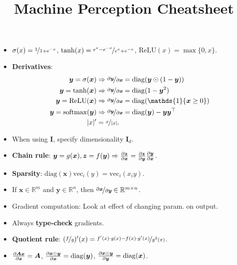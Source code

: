 \documentclass{article}
\title{Machine Perception Cheatsheet}
\newcommand{\R}{\mathbb{R}}
\renewcommand{\vec}[1]{\bm{#1}}
\newcommand{\mat}[1]{\bm{#1}}
\begin{document}
\setlength{\columnsep}{0.15cm}

\begin{multicols*}{2}

    \begin{itemize}
        \item $\sigma(x) = \nicefrac{1}{1 + e^{-x}}$, $\tanh(x) = \nicefrac{e^x - e^{-x}}{e^x + e^{-x}}$, $\mathrm{ReLU}(x) = \max\{ 0,x \}$.
        \item \textbf{Derivatives}:
              \begin{align*}
                  \vec{y} = \sigma(\vec{x})           & \Rightarrow \nicefrac{\partial \vec{y}}{\partial \vec{x}} = \mathrm{diag}(\vec{y} \odot (1 - \vec{y}))    \\
                  \vec{y} = \tanh(\vec{x})            & \Rightarrow \nicefrac{\partial \vec{y}}{\partial \vec{x}} = \mathrm{diag}(1 - \vec{y}^2)                  \\
                  \vec{y} = \mathrm{ReLU}(\vec{x})    & \Rightarrow \nicefrac{\partial \vec{y}}{\partial \vec{x}} = \mathrm{diag}(\mathds{1}\{ \vec{x} \geq 0 \}) \\
                  \vec{y} = \mathrm{softmax}(\vec{y}) & \Rightarrow \nicefrac{\partial \vec{y}}{\partial \vec{x}} = \mathrm{diag}(\vec{y}) - \vec{y} \vec{y}^\top \\
                  |x|'                                & = \nicefrac{x}{|x|}.
              \end{align*}
        \item When using $\mat{I}$, specify dimensionality $\mat{I}_d$.
        \item \textbf{Chain rule}: $\vec{y} = g(\vec{x}), \vec{z} = f(\vec{y}) \Rightarrow \pdv{\vec{z}}{\vec{x}} = \pdv{\vec{z}}{\vec{y}} \pdv{\vec{y}}{\vec{x}}$.
        \item \textbf{Sparsity}: $\mathrm{diag}(\vec{x}) \mathrm{vec}_i(y) = \mathrm{vec}_i(x_i y)$.

        \item If $\vec{x} \in \R^{m}$ and $\vec{y} \in \R^{n}$, then $\nicefrac{\partial \vec{x}}{\partial
                      \vec{y}} \in \R^{m\times n}$.
        \item Gradient computation: Look at effect of changing param. on output.
        \item Always \textbf{type-check} gradients.
        \item \textbf{Quotient rule}: $(\nicefrac{f}{g})'(x) = \nicefrac{f'(x)\cdot g(x) - f(x)\cdot g'(x)}{g^2(x)}$.
        \item $\pdv{\mat{A} \vec{x}}{\vec{x}} = \mat{A}$, $\pdv{\vec{x} \odot \vec{y}}{\vec{x}} = \mathrm{diag}(\vec{y})$, $\pdv{\vec{x} \odot \vec{y}}{\vec{y}} = \mathrm{diag}(\vec{x})$.


\end{itemize}
\end{multicols*}
\end{document}
